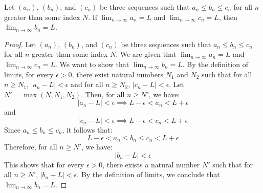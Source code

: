 \begin{theorem}
    Let \( (a_n) \), \( (b_n) \), and \( (c_n) \) be three sequences such that \( a_n \leq b_n \leq c_n \) for all \( n \) greater than some index \( N \). If \( \lim_{n \to \infty} a_n = L \) and \( \lim_{n \to \infty} c_n = L \), then \( \lim_{n \to \infty} b_n = L \).
\end{theorem}
\begin{proof}
    Let \( (a_n) \), \( (b_n) \), and \( (c_n) \) be three sequences such that \( a_n \leq b_n \leq c_n \) for all \( n \) greater than some index \( N \). We are given that \( \lim_{n \to \infty} a_n = L \) and \( \lim_{n \to \infty} c_n = L \). We want to show that \( \lim_{n \to \infty} b_n = L \).
    By the definition of limits, for every \( \epsilon > 0 \), there exist natural numbers \( N_1 \) and \( N_2 \) such that for all \( n \geq N_1 \), \( |a_n - L| < \epsilon \) and for all \( n \geq N_2 \), \( |c_n - L| < \epsilon \).
    Let \( N' = \max(N, N_1, N_2) \). Then, for all \( n \geq N' \), we have:
    \[
        |a_n - L| < \epsilon \implies L - \epsilon < a_n < L + \epsilon
    \]
    and
    \[
        |c_n - L| < \epsilon \implies L - \epsilon < c_n < L + \epsilon
    \]
    Since \( a_n \leq b_n \leq c_n \), it follows that:
    \[
        L - \epsilon < a_n \leq b_n \leq c_n < L + \epsilon
    \]
    Therefore, for all \( n \geq N' \), we have:
    \[
        |b_n - L| < \epsilon
    \]
    This shows that for every \( \epsilon > 0 \), there exists a natural number \( N' \) such that for all \( n \geq N' \), \( |b_n - L| < \epsilon \). By the definition of limits, we conclude that \( \lim_{n \to \infty} b_n = L \).
\end{proof}

